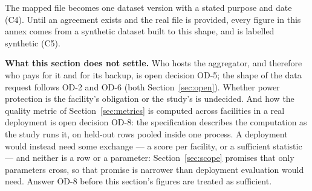 \noindent
The mapped file becomes one dataset version with a stated purpose and date (C4). Until an agreement
exists and the real file is provided, every figure in this annex comes from a synthetic dataset built
to this shape, and is labelled synthetic (C5).

\noindent\textbf{What this section does not settle.} Who hosts the aggregator, and therefore who pays
for it and for its backup, is open decision OD-5; the shape of the data request follows OD-2 and
OD-6 (both Section~\ref{sec:open}). Whether power protection is
the facility's obligation or the study's is undecided. And how the quality metric of
Section~\ref{sec:metrics} is computed across facilities in a real deployment is open decision OD-8:
the specification describes the computation as the study runs it, on held-out rows pooled inside one
process. A deployment would instead need some exchange --- a score per facility, or a sufficient statistic
--- and neither is a row or a parameter: Section~\ref{sec:scope} promises that only parameters
cross, so that promise is narrower than deployment evaluation would need. Answer OD-8 before this section's figures are
treated as sufficient.
